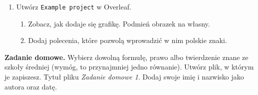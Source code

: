 \documentclass[12pt, letterpaper]{article}
\begin{document}
\begin{enumerate}
Jakie dostrzegasz różnice w ich działaniu?

\item Utwórz \texttt{Example project} w Overleaf. 
\begin{enumerate}
    \item Zobacz, jak dodaje się grafikę. Podmień obrazek na własny.
    \item Dodaj polecenia, które pozwolą wprowadzić w nim polskie znaki.
\end{enumerate}
    
\end{enumerate}
\textbf{Zadanie domowe.} Wybierz dowolną formułę, prawo albo twierdzenie znane ze szkoły średniej (wymóg, to przynajmniej jedno równanie). Utwórz plik, w którym je zapiszesz. Tytuł pliku \textit{Zadanie domowe 1}. Dodaj swoje imię i nazwisko jako autora oraz datę.
\end{document}
